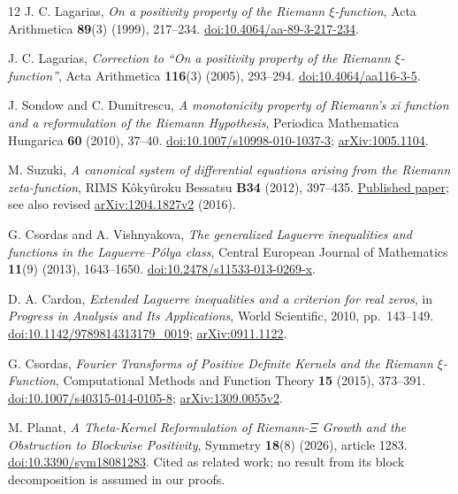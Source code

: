 \documentclass[11pt,letterpaper]{article}
\numberwithin{equation}{section}
\theoremstyle{definition}
\theoremstyle{remark}
\begin{document}
\begin{thebibliography}{12}
J. C. Lagarias, \emph{On a positivity property of the Riemann $\xi$-function}, Acta Arithmetica \textbf{89}(3) (1999), 217--234. \href{https://doi.org/10.4064/aa-89-3-217-234}{doi:10.4064/aa-89-3-217-234}.

J. C. Lagarias, \emph{Correction to ``On a positivity property of the Riemann $\xi$-function''}, Acta Arithmetica \textbf{116}(3) (2005), 293--294. \href{https://doi.org/10.4064/aa116-3-5}{doi:10.4064/aa116-3-5}.

J. Sondow and C. Dumitrescu, \emph{A monotonicity property of Riemann's xi function and a reformulation of the Riemann Hypothesis}, Periodica Mathematica Hungarica \textbf{60} (2010), 37--40. \href{https://doi.org/10.1007/s10998-010-1037-3}{doi:10.1007/s10998-010-1037-3}; \href{https://arxiv.org/abs/1005.1104}{arXiv:1005.1104}.

M. Suzuki, \emph{A canonical system of differential equations arising from the Riemann zeta-function}, RIMS K\^oky\^uroku Bessatsu \textbf{B34} (2012), 397--435. \href{https://www.kurims.kyoto-u.ac.jp/~kenkyubu/bessatsu/open/B34/pdf/B34_023.pdf}{Published paper}; see also revised \href{https://arxiv.org/abs/1204.1827}{arXiv:1204.1827v2} (2016).

G. Csordas and A. Vishnyakova, \emph{The generalized Laguerre inequalities and functions in the Laguerre--P\'olya class}, Central European Journal of Mathematics \textbf{11}(9) (2013), 1643--1650. \href{https://doi.org/10.2478/s11533-013-0269-x}{doi:10.2478/s11533-013-0269-x}.

D. A. Cardon, \emph{Extended Laguerre inequalities and a criterion for real zeros}, in \emph{Progress in Analysis and Its Applications}, World Scientific, 2010, pp.~143--149. \href{https://doi.org/10.1142/9789814313179_0019}{doi:10.1142/9789814313179\_0019}; \href{https://arxiv.org/abs/0911.1122}{arXiv:0911.1122}.

G. Csordas, \emph{Fourier Transforms of Positive Definite Kernels and the Riemann $\xi$-Function}, Computational Methods and Function Theory \textbf{15} (2015), 373--391. \href{https://doi.org/10.1007/s40315-014-0105-8}{doi:10.1007/s40315-014-0105-8}; \href{https://arxiv.org/abs/1309.0055}{arXiv:1309.0055v2}.

M. Planat, \emph{A Theta-Kernel Reformulation of Riemann-$\Xi$ Growth and the Obstruction to Blockwise Positivity}, Symmetry \textbf{18}(8) (2026), article 1283. \href{https://doi.org/10.3390/sym18081283}{doi:10.3390/sym18081283}. Cited as related work; no result from its block decomposition is assumed in our proofs.


\end{thebibliography}
\end{document}
